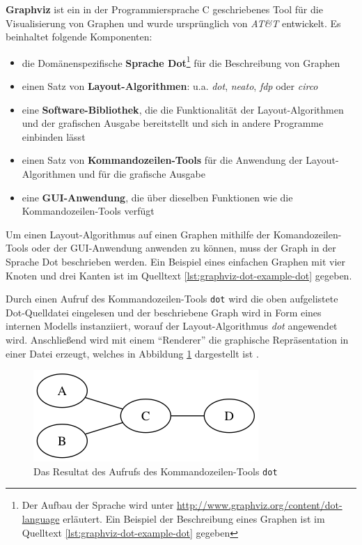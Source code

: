 \textbf{Graphviz} ist ein in der Programmiersprache C geschriebenes Tool für die Visualisierung von Graphen und wurde ursprünglich von \textit{AT\&T} entwickelt. Es beinhaltet folgende Komponenten:

\begin{itemize}
    \item die Domänenspezifische \textbf{Sprache Dot}\footnote{Der Aufbau der Sprache wird unter \url{http://www.graphviz.org/content/dot-language} erläutert. Ein Beispiel der Beschreibung eines Graphen ist im Quelltext \ref{lst:graphviz-dot-example-dot} gegeben} für die Beschreibung von Graphen
    \item einen Satz von \textbf{Layout-Algorithmen}: u.a. \textit{dot}, \textit{neato}, \textit{fdp} oder \textit{circo} \cite{Gansner14Using, NorthGansner14Dot-Manual}
    \item eine \textbf{Software-Bibliothek}, die die Funktionalität der Layout-Algorithmen und der grafischen Ausgabe bereitstellt und sich in andere Programme einbinden lässt \cite{Gansner14Using}
    \item einen Satz von \textbf{Kommandozeilen-Tools} für die Anwendung der Layout-Algorithmen und für die grafische Ausgabe \cite{NorthGansner14Dot-Manual}
    \item eine \textbf{GUI-Anwendung}, die über dieselben Funktionen wie die Kommandozeilen-Tools verfügt
\end{itemize}

Um einen Layout-Algorithmus auf einen Graphen mithilfe der Komandozeilen-Tools oder der GUI-Anwendung anwenden zu können, muss der Graph in der Sprache Dot beschrieben werden. Ein Beispiel eines einfachen Graphen mit vier Knoten und drei Kanten ist im Quelltext \ref{lst:graphviz-dot-example-dot} gegeben.



Durch einen Aufruf des Kommandozeilen-Tools \texttt{dot} wird die oben aufgelistete Dot-Quelldatei eingelesen und der beschriebene Graph wird in Form eines internen Modells instanziiert, worauf der Layout-Algorithmus \textit{dot} angewendet wird. Anschließend wird mit einem \enquote{Renderer} die graphische Repräsentation in einer Datei erzeugt, welches in Abbildung \ref{fig:graphviz-dot-example} dargestellt ist \cite{Gansner14Using}.

\begin{figure}[hbt]
    \centering
    \includegraphics[scale=0.75]{assets/graphviz-dot-example.png}
    \caption{Das Resultat des Aufrufs des Kommandozeilen-Tools \texttt{dot}}
    \label{fig:graphviz-dot-example}
\end{figure}

